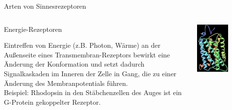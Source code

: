 \documentclass[aspectratio=169]{beamer}
\begin{document}
\begin{frame}{Arten von Sinnesrezeptoren}

\begin{columns}[c]

\begin{column}{7cm}

\begin{block}{Energie-Rezeptoren}

Eintreffen von Energie (z.B. Photon, Wärme) an der Außenseite eines Transmembran-Rezeptors bewirkt eine Änderung der Konformation und setzt dadurch Signalkaskaden im Inneren der Zelle in Gang, die zu einer Änderung des Membranpotentials führen. \\


Beispiel: Rhodopsin in den Stäbchenzellen des Auges ist ein G-Protein gekoppelter Rezeptor.  
\end{block}


\end{column}

\begin{column}{7cm}
\begin{center}

\includegraphics[width=0.6\textwidth]{Rhodopsin_3D.jpg}

\end{center}


\end{column}


\end{columns}

\end{frame}
\end{document}
